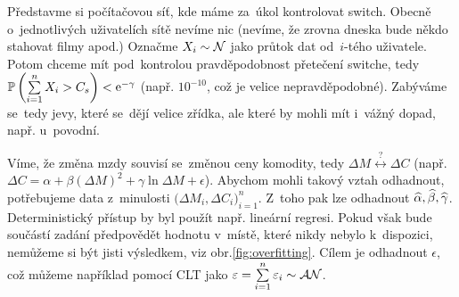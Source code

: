 \begin{example}[MEX] Představme si počítačovou síť, kde máme za~úkol kontrolovat switch. Obecně o~jednotlivých uživatelích sítě nevíme nic (nevíme, že zrovna dneska bude někdo stahovat filmy apod.) Označme $X_i \sim \mathcal{N}$ jako průtok dat od~$i$-tého uživatele. Potom chceme mít pod~kontrolou pravděpodobnost přetečení switche, tedy $\mathbb{P}\left( \sum\limits_{i=1}^{n} X_i>C_s \right)<\mathrm{e}^{-\gamma}$ (např. $10^{-10}$, což je velice nepravděpodobné). Zabýváme se~tedy jevy, které se~dějí velice zřídka, ale které by mohli mít i~vážný dopad, např. u~povodní. 
\end{example}
\begin{example}[Ekonometrie]
	Víme, že změna mzdy souvisí se~změnou ceny komodity, tedy $\Delta M \stackrel{?}{\leftrightarrow}\Delta C$ (např. $\Delta C=\alpha+\beta(\Delta M)^2+\gamma\ln\Delta M+\epsilon$). Abychom mohli takový vztah odhadnout, potřebujeme data z~minulosti $\big(\Delta M_i,\Delta C_i\big)_{i=1}^n$. Z~toho pak lze odhadnout $\widehat{\alpha},\widehat{\beta},\widehat{\gamma}$. Deterministický přístup by byl použít např. lineární regresi. Pokud však bude součástí zadání předpovědět hodnotu v~místě, které nikdy nebylo k~dispozici, nemůžeme si být jisti výsledkem, viz obr.\ref{fig:overfitting}. Cílem je odhadnout $\epsilon$, což můžeme například pomocí CLT jako $\varepsilon=\sum\limits_{i=1}^{n} \varepsilon_i\sim\mathcal{AN}$.
\end{example}





